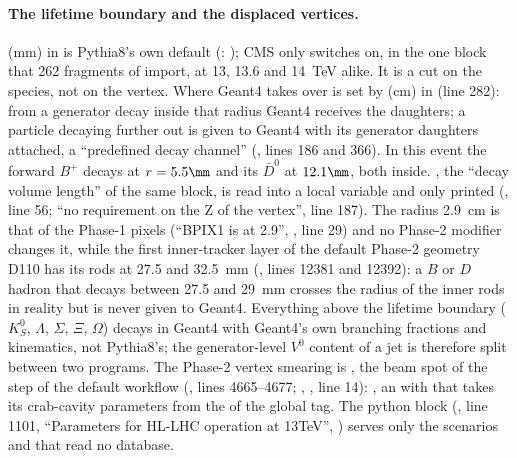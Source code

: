 \paragraph{The lifetime boundary and the displaced vertices.}
 (mm) in  is Pythia8's own default
(: ); CMS only switches  on, in the one block that 262
fragments of  import, at 13, 13.6 and 14~TeV alike. It is a cut on the species,
not on the vertex. Where Geant4 takes over is set by  (cm) in
 (line 282): from a generator decay inside that radius Geant4
receives the daughters; a particle decaying further out is given to Geant4 with its generator daughters attached, a
``predefined decay channel'' (, lines 186 and 366). In this event the
forward $B^+$ decays at $r = 5.5\mm$ and its $\bar{D}^0$ at $12.1\mm$, both inside. , the
``decay volume length'' of the same block, is read into a local variable and only printed (, line
56; ``no requirement on the Z of the vertex'', line 187). The radius 2.9~cm is that of the Phase-1 pixels (``BPIX1 is
at 2.9'', , line 29) and no Phase-2
modifier changes it, while the first inner-tracker layer of the default Phase-2 geometry D110 has its rods at 27.5 and
32.5~mm (, lines 12381
and 12392): a $B$ or $D$ hadron that decays between 27.5 and 29~mm crosses the radius of the inner rods in reality but
is never given to Geant4. Everything above the lifetime boundary ($K^0_S$, $\Lambda$, $\Sigma$, $\Xi$, $\Omega$)
decays in Geant4 with Geant4's own branching fractions and kinematics, not Pythia8's; the generator-level $V^0$
content of a jet is therefore split between two programs. The Phase-2 vertex smearing is , the
beam spot of the step  of the default workflow  (, lines
4665--4677; , , line 14):
, an  with
 that takes its crab-cavity parameters from the  of the global
tag. The python block  (, line 1101, ``Parameters
for HL-LHC operation at 13TeV'', ) serves only the scenarios  and
 that read no database.

